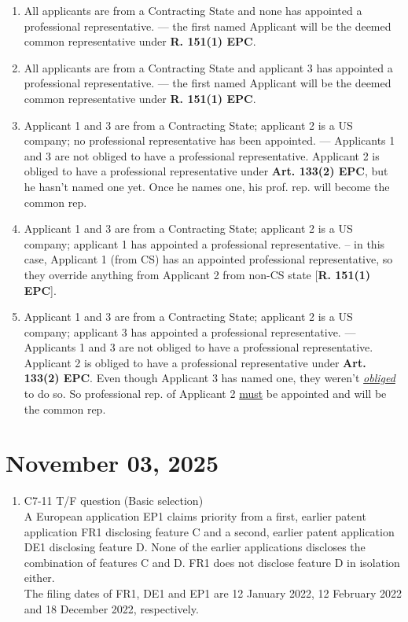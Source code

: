 \documentclass{report}
\begin{document}
\begin{enumerate}[label=\textbf{Answer \arabic*}]
\begin{enumerate}[label=\textbf{Answer \arabic*}]
    \begin{enumerate}[label=(\alph*)]
        \item All applicants are from a Contracting State and none has appointed a professional representative. --- the first named Applicant will be the deemed common representative under \textbf{R. 151(1) EPC}. 
        \item All applicants are from a Contracting State and applicant 3 has appointed a professional representative. --- the first named Applicant will be the deemed common representative under \textbf{R. 151(1) EPC}. 
        \item Applicant 1 and 3 are from a Contracting State; applicant 2 is a US company; no professional representative has been appointed. --- Applicants 1 and 3 are not obliged to have a professional representative. Applicant 2 is obliged to have a professional representative under \textbf{Art. 133(2) EPC}, but he hasn't named one yet. Once he names one, his prof. rep. will become the common rep. 
        \item Applicant 1 and 3 are from a Contracting State; applicant 2 is a US company; applicant 1 has appointed a professional representative. -- in this case, Applicant 1 (from CS) has an appointed professional representative, so they override anything from Applicant 2 from non-CS state [\textbf{R. 151(1) EPC}].
        \item Applicant 1 and 3 are from a Contracting State; applicant 2 is a US company; applicant 3 has appointed a professional representative. --- Applicants 1 and 3 are not obliged to have a professional representative. Applicant 2 is obliged to have a professional representative under \textbf{Art. 133(2) EPC}. Even though Applicant 3 has named one, they weren't \underline{\textit{obliged}} to do so. So professional rep. of Applicant 2 \underline{must} be appointed and will be the common rep. 
    \end{enumerate}

\end{enumerate}
\section{November 03, 2025}

\begin{enumerate}[label=\textbf{Answer \arabic*}]

    \item %
    C7-11 \qquad T/F question (Basic selection) \\
    A European application EP1 claims priority from a first, earlier patent application FR1 disclosing feature C and a second, earlier patent application DE1 disclosing feature D. None of the earlier applications discloses the combination of features C and D. FR1 does not disclose feature D in isolation either. \\
    The filing dates of FR1, DE1 and EP1 are 12 January 2022, 12 February 2022 and 18 December 2022, respectively.
    

\end{enumerate}
\end{enumerate}
\end{document}
